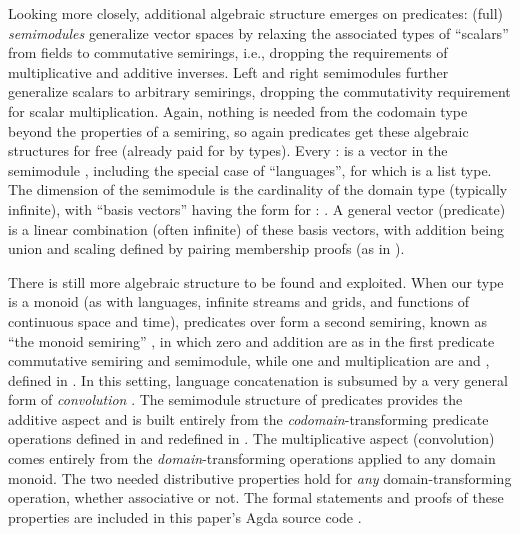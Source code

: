 \documentclass[acmsmall,screen,timestamp]{acmart}  %
\begin{document}
Looking more closely, additional algebraic structure emerges on predicates: (full) \emph{semimodules} generalize vector spaces by relaxing the associated types of ``scalars'' from fields to commutative semirings, i.e., dropping the requirements of multiplicative and additive inverses.
Left and right semimodules further generalize scalars to arbitrary semirings, dropping the commutativity requirement for scalar multiplication.
Again, nothing is needed from the codomain type  beyond the properties of a semiring, so again predicates get these algebraic structures for free (already paid for by types).
Every { \AS :  } is a vector in the semimodule { }, including the special case of ``languages'', for which  is a list type.
The dimension of the semimodule is the cardinality of the domain type  (typically infinite), with ``basis vectors'' having the form { } for { \AS : }.
A general vector (predicate) is a linear combination (often infinite) of these basis vectors, with addition being union and scaling defined by pairing membership proofs (as in ).

There is still more algebraic structure to be found and exploited.
When our  type  is a monoid (as with languages, infinite streams and grids, and functions of continuous space and time), predicates over  form a second semiring, known as ``the monoid semiring'' \citep{Golan2005RecentSemi}, in which zero and addition are as in the first predicate commutative semiring and semimodule, while one and multiplication are  and , defined in .
In this setting, language concatenation is subsumed by a very general form of \emph{convolution} \cite{Golan2005RecentSemi, Dongol2016CUC, Elliott2019-convolution}.
The semimodule structure of predicates provides the additive aspect and is built entirely from the \emph{codomain}-transforming predicate operations defined in  and redefined in .
The multiplicative aspect (convolution) comes entirely from the \emph{domain}-transforming operations applied to any domain monoid.
The two needed distributive properties hold for \emph{any} domain-transforming operation, whether associative or not.
The formal statements and proofs of these properties are included in this paper's Agda source code \citep{Elliott2021-language-derivatives-repo}.
\end{document}

